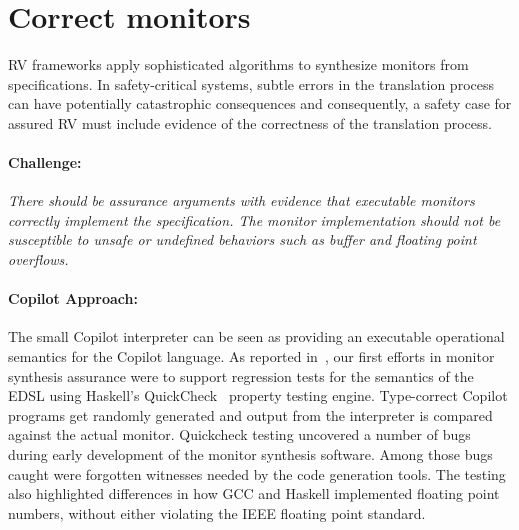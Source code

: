 \section{Correct monitors} \label{sec:codecorrect} 
 RV frameworks apply sophisticated algorithms to synthesize  monitors
 from specifications. In safety-critical systems, subtle errors in the
 translation process can have potentially catastrophic
 consequences and consequently, a safety case for assured RV must
 include  evidence of the correctness of the translation process.



\paragraph{Challenge:} \emph{There should be assurance arguments with
  evidence that
executable monitors correctly implement the specification.  The monitor implementation
should not be susceptible to unsafe or undefined behaviors such as
buffer and floating point overflows.}

\paragraph{Copilot Approach:}    
The  small  Copilot interpreter can be seen as providing an executable
operational semantics for the Copilot language.  As reported
in~\cite{pike-icfp-12}, our first efforts in monitor
synthesis assurance were  to support  regression tests for the semantics
of the EDSL using Haskell's QuickCheck~\cite{qc} property testing
engine. Type-correct Copilot programs get randomly generated and
output from the interpreter is compared against the actual
monitor. Quickcheck testing uncovered 
a number of bugs during early development of the monitor synthesis
software. Among those bugs caught were forgotten witnesses needed by
the code generation tools. The testing also highlighted 
differences in how GCC and Haskell implemented floating point numbers,
without either violating the IEEE floating point standard. 


